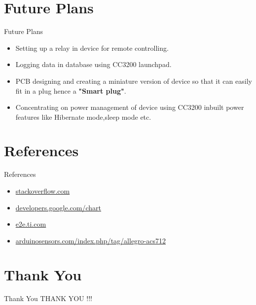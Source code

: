 \documentclass[10pt, a4paper]{beamer}
\begin{document}
\section{Future Plans}
\begin{frame}{Future Plans}
	\begin{itemize}
		\item Setting up a relay in device for remote controlling.
		\item Logging data in database using CC3200 launchpad.
		\item PCB designing and creating a miniature version of device so that it can easily fit in a plug hence a \textbf{"Smart plug"}.
		\item Concentrating on power management of device using CC3200 inbuilt power features like Hibernate mode,sleep mode etc.   
	\end{itemize}
\end{frame}

\section{References}
\begin{frame}{References}
	\begin{itemize}
	\item \url{stackoverflow.com}
	\item \url{developers.google.com/chart}
	\item \url{e2e.ti.com}
	\item \url{arduinosensors.com/index.php/tag/allegro-acs712} 
	\end{itemize}
\end{frame}
\section{Thank You}
\begin{frame}{Thank You}
	\centering THANK YOU !!!
\end{frame}
\end{document}
